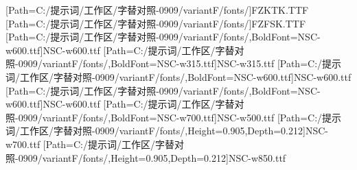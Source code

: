 \setmainfont{Times New Roman}
[Path=C:/提示词/工作区/字替对照-0909/variantF/fonts/]{FZKTK.TTF}
[Path=C:/提示词/工作区/字替对照-0909/variantF/fonts/]{FZFSK.TTF}
[Path=C:/提示词/工作区/字替对照-0909/variantF/fonts/,BoldFont=NSC-w600.ttf]{NSC-w600.ttf}
[Path=C:/提示词/工作区/字替对照-0909/variantF/fonts/,BoldFont=NSC-w315.ttf]{NSC-w315.ttf}
[Path=C:/提示词/工作区/字替对照-0909/variantF/fonts/,BoldFont=NSC-w600.ttf]{NSC-w600.ttf}
[Path=C:/提示词/工作区/字替对照-0909/variantF/fonts/,BoldFont=NSC-w600.ttf]{NSC-w600.ttf}
[Path=C:/提示词/工作区/字替对照-0909/variantF/fonts/,BoldFont=NSC-w700.ttf]{NSC-w500.ttf}
\newfontfamily{\numboldjian}[Path=C:/提示词/工作区/字替对照-0909/variantF/fonts/,Height=0.905,Depth=0.212]{NSC-w700.ttf}
\newfontfamily{\numbold}[Path=C:/提示词/工作区/字替对照-0909/variantF/fonts/,Height=0.905,Depth=0.212]{NSC-w850.ttf}
\newcommand{\heiti}{\CJKfamily{heibf}}
\newcommand{\heizhang}{\CJKfamily{heizhang}}
\newcommand{\hejie}{\CJKfamily{hejie}}
\newcommand{\hekeshi}{\CJKfamily{hekeshi}}
\newcommand{\heibf}{\CJKfamily{heibf}}
\newcommand{\heihao}{\CJKfamily{heihao}}
\newcommand{\kaishu}{\CJKfamily{kai}}
\newcommand{\fangsong}{\CJKfamily{fangsong}}
